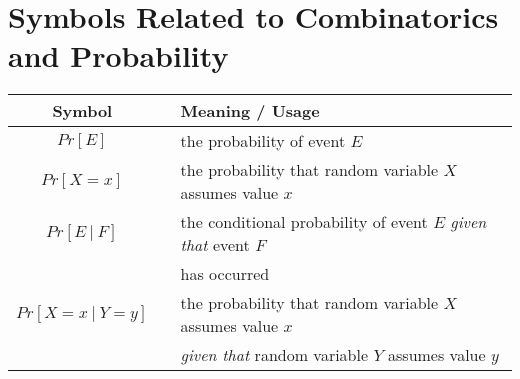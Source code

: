 \newpage

\section*{Symbols Related to Combinatorics and Probability}

\begin{tabular}{c|cl}
{\bf Symbol} & & {\bf Meaning} / {\bf Usage} \\ \hline
\hline
$Pr[E]$
  & & the probability of event $E$ \\ \hline
$Pr[X=x]$
  & & the probability that random variable $X$ assumes value $x$ \\ \hline
$Pr[E \ | \ F]$
  &  & the conditional probability of event $E$ {\em given that} event $F$ \\
  &  & has occurred \\ \hline
$Pr[X=x \ | \ Y=y]$
  & & the probability that random variable $X$ assumes value $x$ \\
  & & {\em given that} random variable $Y$ assumes value $y$ \\ \hline
\end{tabular}


